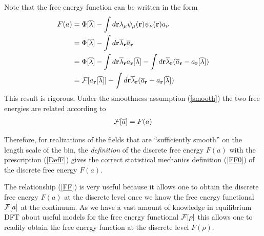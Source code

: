 \documentclass[b5paper,openright,11pt]{book}
\begin{document}
\begin{appendices}
Note that the free energy function can be written in the form
\begin{align}
  F(a) &=\Phi[\overline{\lambda}]-\int d{\bf r}\lambda_\mu\psi_\mu({\bf r})\psi_\nu({\bf r})a_\nu
\nonumber\\
&=\Phi[\overline{\lambda}]-\int d{\bf r}\overline{\lambda}_{\bf r}\overline{a}_{\bf r}
\nonumber\\
&=\Phi[\overline{\lambda}]-\int d{\bf r}\overline{\lambda}_{\bf r}a_{\bf r}[\overline{\lambda}]
-\int d{\bf r}\overline{\lambda}_{\bf r}(\overline{a}_{\bf r}-a_{\bf r}[\overline{\lambda}])
\nonumber\\
&={\cal F}[a_{\bf r}[\overline{\lambda}]]-\int d{\bf r}\overline{\lambda}_{\bf r}(\overline{a}_{\bf r}-a_{\bf r}[\overline{\lambda}])
\end{align}
This result is rigorous. Under the smoothness assumption (\ref{smooth})
the two free energies are related according to
\begin{align}
  {\cal F}[\overline{a}]={F}(a)
\label{FF}
\end{align}

Therefore, for realizations of the fields that
are  ``sufficiently smooth''  on  the  length scale  of  the bin,  the
\textit{definition}  of  the  discrete  free energy  $F(a)$  with  the
prescription  (\ref{DefF})  gives  the correct  statistical  mechanics
definition (\ref{FF0}) of the discrete free energy ${F}(a)$.

The relationship (\ref{FF}) is very useful because it allows one to obtain
the discrete free energy $F(a)$ at the discrete level once we know the
free energy  functional ${\cal F}[a]$ at  the continuum. As we  have a
vast amount  of knowledge in  equilibrium DFT about useful  models for
the free  energy functional  ${\cal F}[\rho]$  this allows one to readily
obtain the free energy function at the discrete level $F(\rho)$.



\end{appendices}
\end{document}
